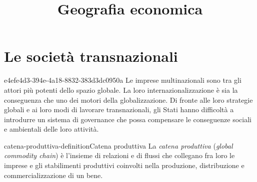 \documentclass[preview]{standalone}
\begin{document}
\title{Geografia economica}
\genpage

\section{Le società transnazionali}

\begin{snippet}{e4efe4d3-394e-4a18-8832-383d3dc0950a}
    Le imprese multinazionali sono tra gli attori più potenti dello spazio globale. La loro
    internazionalizzazione è sia la conseguenza che uno dei motori della globalizzazione. Di fronte alle loro
    strategie globali e ai loro modi di lavorare transnazionali, gli Stati hanno difficoltà a introdurre un
    sistema di governance che possa compensare le conseguenze sociali e ambientali delle loro attività.
\end{snippet}


\begin{snippetdefinition}{catena-produttiva-definition}{Catena produttiva}
    La \textit{catena produttiva} (\textit{global commodity chain}) è l'insieme di relazioni e di flussi che collegano
    fra loro le imprese e gli stabilimenti produttivi coinvolti nella 
    produzione, distribuzione e commercializzazione di un bene.
\end{snippetdefinition}
\end{document}
